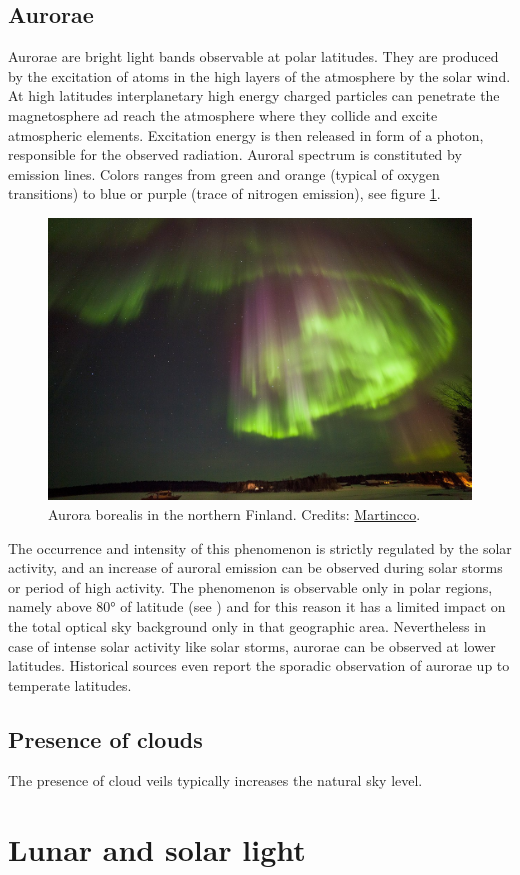 \documentclass[a4paper, titlepage, 10pt]{book}
\begin{document}
\subsection{Aurorae}
Aurorae are bright light bands observable at polar latitudes. They are produced by the excitation of atoms in the high layers of the atmosphere by the solar wind. At high latitudes interplanetary high energy charged particles can penetrate the magnetosphere ad reach the atmosphere where they collide and excite atmospheric elements. Excitation energy is then released in form of a photon, responsible for the observed radiation. Auroral spectrum is constituted by emission lines. Colors ranges from green and orange (typical of oxygen transitions) to blue or purple (trace of nitrogen emission), see figure \ref{fig:aurora}.
\begin{figure}
	\centering
	\includegraphics[width=.8\textwidth]{aurora}
	\caption{Aurora borealis in the northern Finland. Credits: \href{https://commons.wikimedia.org/wiki/File:Aurora_Borealis_-_polar_lights_3.jpg}{Martincco}.\label{fig:aurora}}
\end{figure}

The occurrence and intensity of this phenomenon is strictly regulated by the solar activity, and an increase of auroral emission can be observed during solar storms or period of high activity. The phenomenon is observable only in polar regions, namely above \ang{80} of latitude (see \cite{eather1969latitudinal}) and for this reason it has a limited impact on the total optical sky background only in that geographic area. Nevertheless in case of intense solar activity like solar storms, aurorae can be observed at lower latitudes. Historical sources even report the sporadic observation of aurorae up to temperate latitudes.






\subsection{Presence of clouds}
The presence of cloud veils typically increases the natural sky level.

\section{Lunar and solar light}



\end{document}
